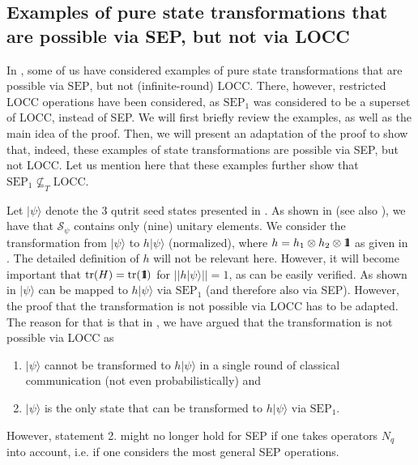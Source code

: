 \documentclass[superscriptaddress,twocolumn]{revtex4}\usepackage[utf8]{inputenc}
\newcommand{\tr}{\text{tr}}
\newcommand{\one}{\mbox{$1 \hspace{-1.0mm}  {\bf l}$}}
\newcommand{\ket}[1]{|#1\rangle}
\begin{document}
\subsection{Examples of pure state transformations that are possible via SEP, but not via LOCC}
In \cite{HeSp16}, some of us have considered examples of pure state transformations that are possible via $\textrm{SEP}$, but not (infinite-round) LOCC. There, however, restricted LOCC operations have been considered, as $\textrm{SEP}_1$ was considered to be a superset of LOCC, instead of SEP. We will first briefly review the examples, as well as the main idea of the proof.
Then, we will present an adaptation of the proof to show that, indeed, these examples of state transformations are possible via SEP, but not LOCC. Let us mention here that these examples further show that $\textrm{SEP}_1 {\not\subseteq}_T \textrm{LOCC}$.

Let $\ket{\psi}$ denote the 3 qutrit seed states presented in \cite{HeSp16}. As shown in \cite{HeSp16} (see also \cite{BrLu04}), we have that $\mathcal{S}_\psi$ contains only (nine) unitary elements. We consider the transformation from $\ket{\psi}$ to $h \ket{\psi}$ (normalized), where $h=h_1\otimes h_2 \otimes \one$ as given in \cite{HeSp16}. The detailed definition of $h$ will not be relevant here. However, it will become important that $\tr(H)=\tr(\one)$ for $||h\ket{\psi}||=1$, as can be easily verified. As shown in \cite{HeSp16} $\ket{\psi}$ can be mapped to $h \ket{\psi}$ via $\textrm{SEP}_1$ (and therefore also via SEP). However, the proof that the transformation is not possible via LOCC has to be adapted. The reason for that is that in \cite{HeSp16}, we have argued that the transformation is not possible via LOCC as
\begin{enumerate}
\item $\ket{\psi}$ cannot be transformed to $h \ket{\psi}$ in a single round of classical communication (not even probabilistically) and
\item $\ket{\psi}$ is the only state that can be transformed to $h \ket{\psi}$ via $\textrm{SEP}_1$.
\end{enumerate}
However, statement 2. might no longer hold for SEP if one takes operators $N_q$ into account, i.e. if one considers the most general SEP operations.
\end{document}
